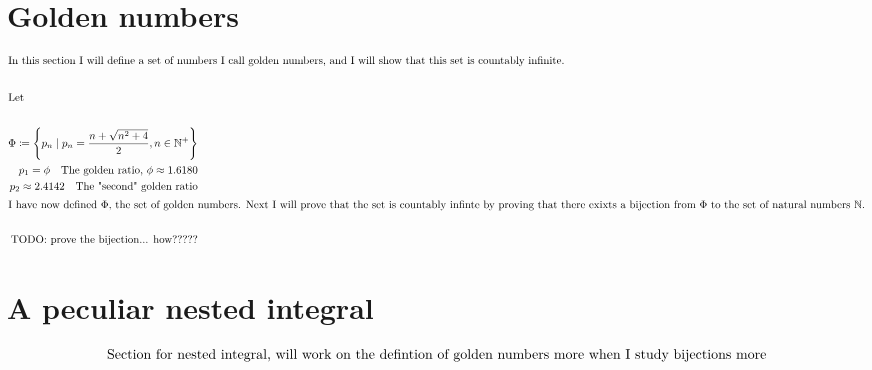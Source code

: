 \documentclass[a4paper]{article}
\begin{document}
\section*{Golden numbers}
\begin{align*}
    \intertext{In this section I will define a set of numbers I call golden numbers, and I will show that this set is countably infinite.}\\
    \intertext{Let}\\
    \Phi \coloneq \left\{p_n \mid p_n=\frac{n+\sqrt{n^2+4}}{2}, n\in\mathbb{N^+}\right\}\\
    p_1=\phi\quad\text{The golden ratio, $\phi\approx 1.6180$}\\
    p_2\approx2.4142\quad\text{The "second" golden ratio}\\
    \intertext{I have now defined $\Phi$, the set of golden numbers. Next I will prove that the set is countably infinte by proving that there exixts a bijection from $\Phi$ to the set of natural numbers $\mathbb{N}$.}\\
    \text{TODO: prove the bijection... how?????}
\end{align*}

\section*{A peculiar nested integral}
\begin{align*}
    \intertext{Section for nested integral, will work on the defintion of golden numbers more when I study bijections more}\\
    \\
\end{align*}
\end{document}
